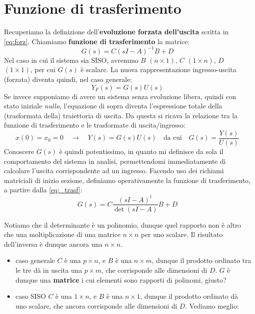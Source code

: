 \section{Funzione di trasferimento}
\begin{defin}{}{}
Recuperiamo la definizione dell'\textbf{evoluzione forzata dell'uscita} scritta in \eqref{eq:forz}. Chiamiamo  \textbf{funzione di trasferimento} la matrice:
\begin{equation}
\label{eq:_trasf}
G(s) = C(sI-A)^{-1}B + D
\end{equation}
Nel caso in cui il sistema sia SISO, avremmo $B$ $(n\times 1)$, $C$ $(1 \times n)$, $D$ $(1 \times 1)$, per cui $G(s)$ è scalare. La nuova rappresentazione ingresso-uscita (forzata) diventa quindi, nel caso generale:
\begin{equation}
\label{eq:gs_evoforz_y}
Y_F(s) = G(s)U(s)
\end{equation}
Se invece supponiamo di avere un sistema senza evoluzione libera, quindi con stato iniziale \textit{nullo}, l'equazione di sopra diventa l'espressione totale della (trasformata della) traiettoria di uscita. Da questa si ricava la relazione tra la funzione di trasferimento e le trasformate di uscita/ingresso:
\begin{equation}
	x(0) = x_0 = 0 \quad \rightarrow \quad Y(s) = G(s)U(s) \quad \textrm{da cui} \quad \boxed{G(s) = \frac{Y(s)}{U(s)}}
\end{equation}
Conoscere $G(s)$ è quindi potentissimo, in quanto mi definisce da sola il comportamento del sistema in analisi, permettendomi immediatamente di calcolare l'uscita corrispondente ad un ingresso.
\bb
Facendo uso dei richiami matriciali di inizio sezione, definiamo operativamente la funzione di trasferimento, a partire dalla \eqref{eq:_trasf}:
\begin{equation}
G(s) = C \frac{(sI-A)^\dag}{\det(sI-A)}B+D
\end{equation} 
\end{defin}
Notiamo che il determinante è un polinomio, dunque quel rapporto non è altro che una moltiplicazione di una matrice $n\times n$ per uno scalare. Il risultato dell'inversa è dunque ancora una $n\times n$.
\begin{itemize}
\item caso generale \rarr $C$ è una $p \times n$, e $B$ è una $n \times m$, dunque il prodotto ordinato tra le tre dà in uscita una $p \times m$, che corrisponde alle dimensioni di $D$. $G$ è dunque una \textbf{matrice} i cui elementi sono rapporti di polinomi, giusto?
\item caso SISO \rarr $C$ è una $1\times n$, e $B$ è una $n\times 1$, dunque il prodotto ordinato dà uno scalare, che ancora corrisponde alle dimensioni di $D$. Vediamo meglio:
\end{itemize}

